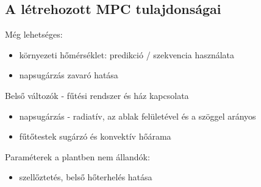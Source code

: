 \subsection{A létrehozott MPC tulajdonságai}

\begin{formal}
	Még lehetséges:
	\begin{itemize}[noitemsep,topsep=-8pt,parsep=0pt,partopsep=0pt]
		\item környezeti hőmérséklet: predikció / szekvencia használata%
		\item napsugárzás zavaró hatása%
	\end{itemize}
	
	Belső változók - fűtési rendszer és ház kapcsolata
	\begin{itemize}[noitemsep,topsep=-6pt,parsep=0pt,partopsep=0pt]
		\item napsugárzás - radiatív, az ablak felületével és a szöggel arányos
		\item fűtőtestek sugárzó és konvektív hőárama
	\end{itemize}
	
	Paraméterek a plantben nem állandók:
	\begin{itemize}[noitemsep,topsep=-6pt,parsep=0pt,partopsep=0pt]
		\item szellőztetés, belső hőterhelés hatása
	\end{itemize}
\end{formal}

%

